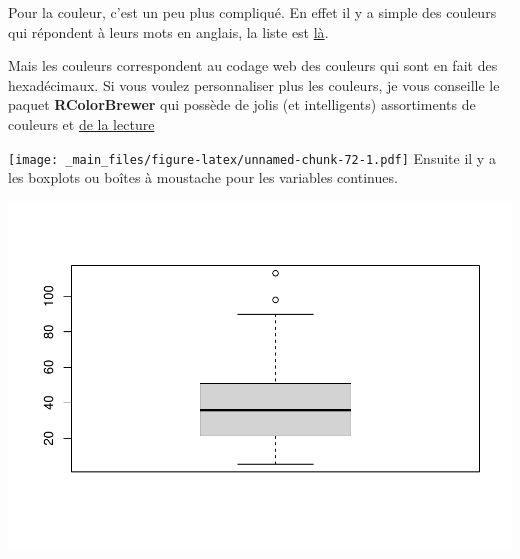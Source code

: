 \documentclass[
]{book}
\newenvironment{Shaded}{\begin{snugshade}}{\end{snugshade}}
\newcommand{\AttributeTok}[1]{\textcolor[rgb]{0.13,0.29,0.53}{#1}}
\newcommand{\FunctionTok}[1]{\textcolor[rgb]{0.13,0.29,0.53}{\textbf{#1}}}
\newcommand{\NormalTok}[1]{#1}
\newcommand{\SpecialCharTok}[1]{\textcolor[rgb]{0.81,0.36,0.00}{\textbf{#1}}}
\newcommand{\StringTok}[1]{\textcolor[rgb]{0.31,0.60,0.02}{#1}}
\begin{document}
Pour la couleur, c'est un peu plus compliqué. En effet il y a simple des couleurs
qui répondent à leurs mots en anglais, la liste est \href{https://www.datanovia.com/en/blog/awesome-list-of-657-r-color-names/}{là}.

Mais les couleurs correspondent au codage web des couleurs qui sont en fait des
hexadécimaux. Si vous voulez personnaliser plus les couleurs, je vous conseille
le paquet \textbf{RColorBrewer} qui possède de jolis (et intelligents) assortiments
de couleurs et \href{https://larmarange.github.io/analyse-R/couleurs.html}{de la lecture}

\begin{Shaded}
\end{Shaded}

\texttt{[image: \_main\_files/figure-latex/unnamed-chunk-72-1.pdf]}
Ensuite il y a les boxplots ou boîtes à moustache pour les variables continues.

\begin{Shaded}
\end{Shaded}

\includegraphics{_main_files/figure-latex/poids4-1.pdf}
\end{document}
